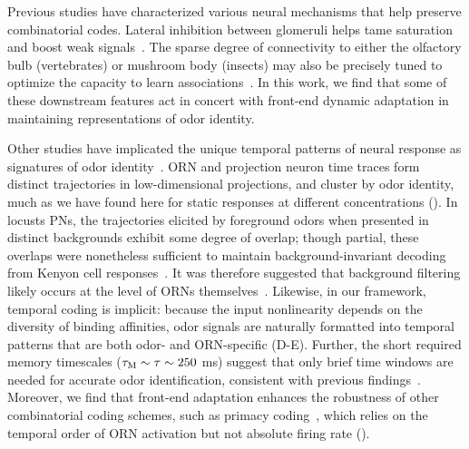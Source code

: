 \documentclass[9pt,lineno]{elife}
\begin{document}


Previous studies have characterized various neural mechanisms that help preserve combinatorial codes. 
Lateral inhibition between glomeruli helps tame saturation and boost weak signals~\citep{divisive_normalization}. %
The sparse degree of connectivity to either the olfactory bulb (vertebrates) or mushroom body (insects) %
may also be precisely tuned to optimize the capacity to learn associations~\citep{litwinkumar}. In this work, we find that some of these downstream features act in concert with front-end dynamic adaptation in maintaining representations of odor identity.

Other studies have implicated the unique temporal patterns of neural response as signatures of odor identity~\citep{stopfer_temporal_model, multiple_timescales_stopfer, stopfer_nat_neuro, stopfer_temporal_channel}. ORN and projection neuron time traces form distinct trajectories in low-dimensional projections, and cluster by odor identity, much as we have found here for static responses at different concentrations (). In locusts PNs, the trajectories elicited by foreground odors when presented in distinct backgrounds exhibit some degree of overlap; though partial, these overlaps were nonetheless sufficient to maintain background-invariant decoding from Kenyon cell responses~\citep{coding_background}. It was therefore suggested that background filtering likely occurs at the level of ORNs themselves~\citep{coding_background}. Likewise, in our framework, temporal coding is implicit: because the input nonlinearity depends on the diversity of binding affinities, %
odor signals are naturally formatted into temporal patterns that are both odor- and ORN-specific  (D-E). Further, the short required memory timescales  ($\tau_{\textup M} \sim \tau \sim 250$ ms) suggest that only brief time windows are needed for accurate odor identification, consistent with previous findings~\citep{stopfer_nat_neuro, coding_background}. Moreover, we find that front-end adaptation enhances the robustness of other combinatorial coding schemes, such as primacy coding~\citep{primacy_coding}, which relies on the temporal order of ORN activation but not absolute firing rate ().
\end{document}
